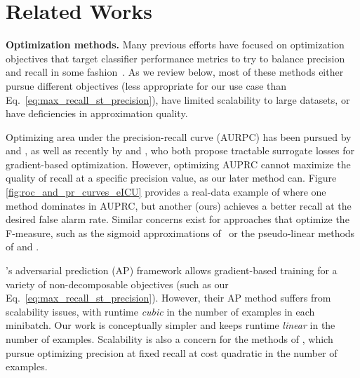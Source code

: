 \section{Related Works}
\textbf{Optimization methods.} Many previous efforts have focused on optimization objectives that target classifier performance metrics to try to balance precision and recall in some fashion~\citep{rakotomamonjyOptimizingAreaRoc2004,burgesLearningRankNonsmooth2006,yueSupportVectorMethod2007,liptonOptimalThresholdingClassifiers2014}.
As we review below, most of these methods either pursue different objectives (less appropriate for our use case than Eq.~\eqref{eq:max_recall_st_precision}), have limited scalability to large datasets, or have deficiencies in approximation quality.

Optimizing area under the precision-recall curve (AURPC) has been pursued by  
\citet{metzlerMarkovRandomField2005} and \citet{caruanaEmpiricalComparisonSupervised2006}, as well as recently by \citet{ramzi2021robust} and \citet{qi2021stochastic}, who both propose tractable surrogate losses for gradient-based optimization.
However, optimizing AUPRC cannot maximize the quality of recall at a specific precision value, as our later method can.
Figure \ref{fig:roc_and_pr_curves_eICU} provides a real-data example of where one method dominates in AUPRC, but another (ours) achieves a better recall at the desired false alarm rate.
Similar concerns exist for approaches that optimize the F-measure, such as the sigmoid approximations of~\citet{tsoiHeavisideFunctionApproximation2021} or the pseudo-linear methods of \citet{narasimhan2015optimizing} and \citet{puthiya2014optimizing}.

\citet{fathonyAPperfIncorporatingGeneric2020}'s adversarial prediction (AP) framework allows gradient-based training for a variety of non-decomposable objectives (such as our Eq.~\eqref{eq:max_recall_st_precision}).
However, their AP method suffers from scalability issues, with runtime \emph{cubic} in the number of examples in each minibatch.
Our work is conceptually simpler and keeps runtime \emph{linear} in the number of examples. 
Scalability is also a concern for the methods of \citet{joachimsSupportVectorMethod2005}, which pursue optimizing precision at fixed recall at cost quadratic in the number of examples.

